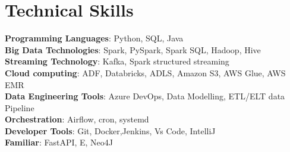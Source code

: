 \documentclass[letterpaper,11pt]{article}
\begin{document}
\section{Technical Skills}
 \begin{itemize}[leftmargin=0.15in, label={}]
    \small{\item{
     \textbf{Programming Languages}{:\hspace{0.06cm}  Python, SQL, Java} \\
     \textbf{Big Data Technologies}{:\hspace{0.49cm}     Spark, PySpark, Spark SQL, Hadoop, Hive } \\
     \textbf{Streaming Technology}{:\hspace{0.51cm} Kafka, Spark structured streaming} \\
     \textbf{Cloud computing}{:\hspace{1.38cm} ADF, Databricks, ADLS, Amazon S3, AWS Glue, AWS EMR } \\
     \textbf{Data Engineering Tools}{:\hspace{0.28cm} Azure DevOps, Data Modelling, ETL/ELT data Pipeline}\\
     \textbf{Orchestration}{:\hspace{2.02cm} Airflow, cron, systemd} \\
     \textbf{Developer  Tools}{:\hspace{1.58cm} Git, Docker,Jenkins, Vs Code, IntelliJ } \\
     \textbf{Familiar}{:\hspace{3cm} FastAPI, E, Neo4J} \\
     
     
    }}
 \end{itemize}

\end{document}
